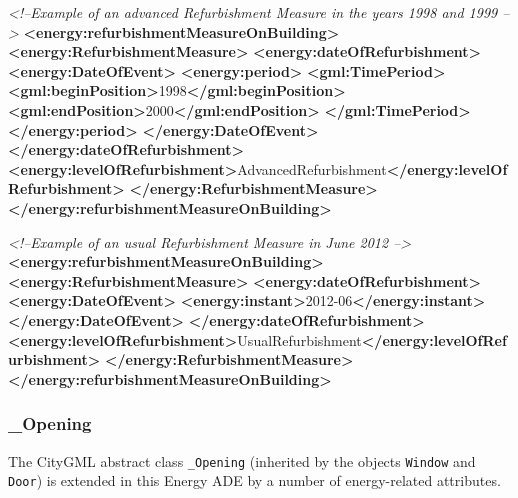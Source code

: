 \documentclass[a4paper,12pt]{article}
\newenvironment{Shaded}{}{}
\newcommand{\KeywordTok}[1]{\textcolor[rgb]{0.00,0.44,0.13}{\textbf{{#1}}}}
\newcommand{\CommentTok}[1]{\textcolor[rgb]{0.38,0.63,0.69}{\textit{{#1}}}}
\newcommand{\NormalTok}[1]{{#1}}
\begin{document}
\begin{Shaded}
\begin{Highlighting}[]
\CommentTok{<!--Example of an advanced Refurbishment Measure in the years 1998 and 1999 -->}
\KeywordTok{<energy:refurbishmentMeasureOnBuilding>}
    \KeywordTok{<energy:RefurbishmentMeasure>}
        \KeywordTok{<energy:dateOfRefurbishment>}
            \KeywordTok{<energy:DateOfEvent>}
                \KeywordTok{<energy:period>}
                    \KeywordTok{<gml:TimePeriod>}
                        \KeywordTok{<gml:beginPosition>}\NormalTok{1998}\KeywordTok{</gml:beginPosition>}
                        \KeywordTok{<gml:endPosition>}\NormalTok{2000}\KeywordTok{</gml:endPosition>}
                    \KeywordTok{</gml:TimePeriod>}
                \KeywordTok{</energy:period>}
            \KeywordTok{</energy:DateOfEvent>}
        \KeywordTok{</energy:dateOfRefurbishment>}
        \KeywordTok{<energy:levelOfRefurbishment>}\NormalTok{AdvancedRefurbishment}\KeywordTok{</energy:levelOfRefurbishment>}
    \KeywordTok{</energy:RefurbishmentMeasure>}
\KeywordTok{</energy:refurbishmentMeasureOnBuilding>}
\end{Highlighting}
\end{Shaded}

\begin{Shaded}
\begin{Highlighting}[]
\CommentTok{<!--Example of an usual Refurbishment Measure in June 2012 -->}
\KeywordTok{<energy:refurbishmentMeasureOnBuilding>}
    \KeywordTok{<energy:RefurbishmentMeasure>}
        \KeywordTok{<energy:dateOfRefurbishment>}
            \KeywordTok{<energy:DateOfEvent>}
                \KeywordTok{<energy:instant>}\NormalTok{2012-06}\KeywordTok{</energy:instant>}
            \KeywordTok{</energy:DateOfEvent>}
        \KeywordTok{</energy:dateOfRefurbishment>}
        \KeywordTok{<energy:levelOfRefurbishment>}\NormalTok{UsualRefurbishment}\KeywordTok{</energy:levelOfRefurbishment>}
    \KeywordTok{</energy:RefurbishmentMeasure>}
\KeywordTok{</energy:refurbishmentMeasureOnBuilding>}
\end{Highlighting}
\end{Shaded}

\subsubsection{\_Opening}\label{opening}

The CityGML abstract class \texttt{\_Opening} (inherited by the objects
\texttt{Window} and \texttt{Door}) is extended in this Energy ADE by a
number of energy-related attributes.
\end{document}
